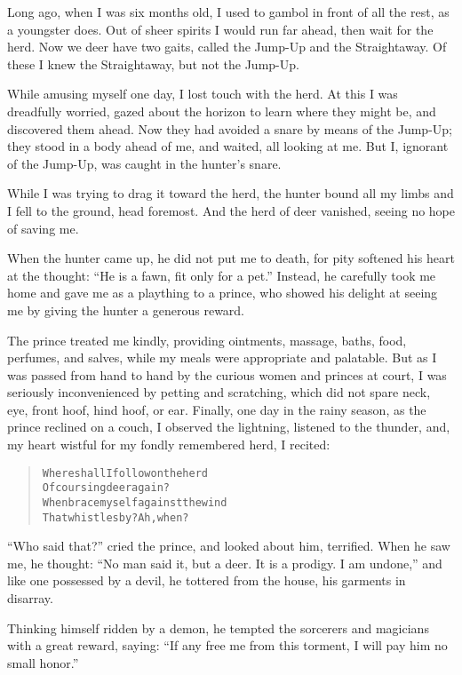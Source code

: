 \documentclass[article, twoside, 14pt]{memoir}
\renewenvironment{verbatim}{%
\begin{quote}%
\vskip -10pt%
\begin{alltt}\normalfont\large}{\end{alltt}%
\end{quote}%
\vskip -10pt
} %
\begin{document}
\label{s45}

Long ago, when I was six months old, I used to gambol in front of
all the rest, as a youngster does. Out of sheer spirits I would run
far ahead, then wait for the herd. Now we deer have two gaits,
called the Jump-Up and the Straightaway. Of these I knew the
Straightaway, but not the Jump-Up.

While amusing myself one day, I lost touch with the herd. At this I
was dreadfully worried, gazed about the horizon to learn where they
might be, and discovered them ahead. Now they had avoided a snare
by means of the Jump-Up; they stood in a body ahead of me, and
waited, all looking at me. But I, ignorant of the Jump-Up,
was caught in the hunter's snare.

While I was trying to drag it toward the herd, the hunter bound all
my limbs and I fell to the ground, head foremost. And the herd of
deer vanished, seeing no hope of saving me.

When the hunter came up, he did not put me to death, for pity
softened his heart at the thought:
``He is a fawn, fit only for a pet.'' Instead, he carefully took me
home and gave me as a plaything to a prince, who showed his delight
at seeing me by giving the hunter a generous reward.

The prince treated me kindly, providing ointments, massage, baths,
food, perfumes, and salves, while my meals were appropriate and
palatable. But as I was passed from hand to hand by the curious
women and princes at court, I was seriously inconvenienced by
petting and scratching, which did not spare neck, eye, front hoof,
hind hoof, or ear. Finally, one day in the rainy season, as the
prince reclined on a couch, I observed the lightning, listened to
the thunder, and, my heart wistful for my fondly remembered herd, I
recited:

\begin{verbatim}
Where shall I follow on the herd
    Of coursing deer again?
When brace myself against the wind
    That whistles by? Ah, when?
\end{verbatim}
``Who said that?'' cried the prince, and looked about him,
terrified. When he saw me, he thought:
``No man said it, but a deer. It is a prodigy. I am undone,'' and
like one possessed by a devil, he tottered from the house, his
garments in disarray.

Thinking himself ridden by a demon, he tempted the sorcerers and
magicians with a great reward, saying:
``If any free me from this torment, I will pay him no small honor.''
\end{document}
